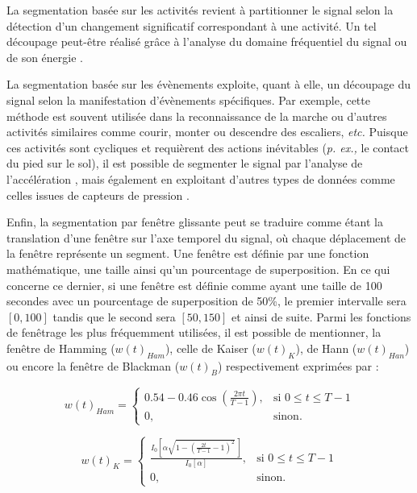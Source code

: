 La segmentation basée sur les activités revient à partitionner le signal selon la détection d'un changement significatif correspondant à une activité. Un tel découpage peut-être réalisé grâce à l'analyse du domaine fréquentiel du signal ou de son énergie \citep{Sekine2000, Guenterberg2009}.

La segmentation basée sur les évènements exploite, quant à elle, un découpage du signal selon la manifestation d'évènements spécifiques. Par exemple, cette méthode est souvent utilisée dans la reconnaissance de la marche ou d'autres activités similaires comme courir, monter ou descendre des escaliers, \textit{etc. } Puisque ces activités sont cycliques et requièrent des actions inévitables (\textit{p. ex., } le contact du pied sur le sol), il est possible de segmenter le signal par l'analyse de l'accélération \citep{SantAnna2010}, mais également en exploitant d'autres types de données comme celles issues de capteurs de pression \citep{Crea2012}.

Enfin, la segmentation par fenêtre glissante peut se traduire comme étant la translation d'une fenêtre sur l'axe temporel du signal, où chaque déplacement de la fenêtre représente un segment. Une fenêtre est définie par une fonction mathématique, une taille ainsi qu'un pourcentage de superposition. En ce qui concerne ce dernier, si une fenêtre est définie comme ayant une taille de 100 secondes avec un pourcentage de superposition de 50\%, le premier intervalle sera $\left[0,100\right]$ tandis que le second sera $\left[50,150\right]$ et ainsi de suite. Parmi les fonctions de fenêtrage les plus fréquemment utilisées, il est possible de mentionner, la fenêtre de Hamming ($w(t)_{Ham}$), celle de Kaiser ($w(t)_K$), de Hann ($w(t)_{Han}$) ou encore la fenêtre de Blackman ($w(t)_B$) respectivement exprimées par :

\begin{equation}
	\label{eq:hamming}
	w\left(t\right)_{Ham} = \left\{
	\begin{array}{ll}
		0.54-0.46\cos(\frac{2\pi t}{T-1}), & \mbox{si } 0 \leq t \leq T-1 \\
		0,								   & \mbox{sinon.}
	\end{array}
	\right.
\end{equation}

\begin{equation}
	\label{eq:kaiser}
	w\left(t\right)_K = \left\{
	\begin{array}{ll}
		\frac{I_0\left[\alpha\sqrt{1-(\frac{2t}{T-1}-1)^2}\,\right]}{I_0\left[\alpha\right]}, & \mbox{si } 0 \leq t \leq T-1 \\
		0,                                    & \mbox{sinon.}
	\end{array}
	\right.
\end{equation}

